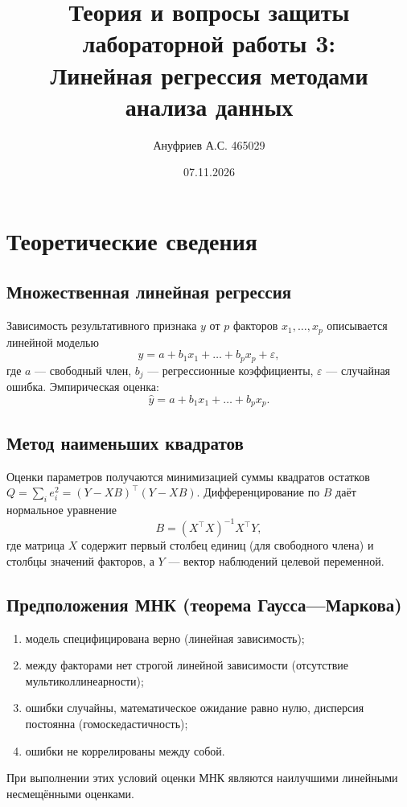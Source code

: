 \documentclass[12pt,a4paper]{article}
\title{Теория и вопросы защиты лабораторной работы 3:\\ Линейная регрессия методами анализа данных}
\author{Ануфриев А.С. 465029}
\date{07.11.2026}
\begin{document}
\maketitle

\section{Теоретические сведения}

\subsection{Множественная линейная регрессия}
Зависимость результативного признака $y$ от $p$ факторов $x_1,\dots,x_p$ описывается линейной моделью
\begin{equation}
y = a + b_1 x_1 + \dots + b_p x_p + \varepsilon ,
\end{equation}
где $a$ --- свободный член, $b_j$ --- регрессионные коэффициенты, $\varepsilon$ --- случайная ошибка. Эмпирическая оценка:
\begin{equation}
\hat{y} = a + b_1 x_1 + \dots + b_p x_p .
\end{equation}

\subsection{Метод наименьших квадратов}
Оценки параметров получаются минимизацией суммы квадратов остатков $Q = \sum_i e_i^2 = (Y-XB)^\top(Y-XB)$. Дифференцирование по $B$ даёт нормальное уравнение
\begin{equation}
B = (X^\top X)^{-1} X^\top Y ,
\end{equation}
где матрица $X$ содержит первый столбец единиц (для свободного члена) и столбцы значений факторов, а $Y$ --- вектор наблюдений целевой переменной.

\subsection{Предположения МНК (теорема Гаусса---Маркова)}
\begin{enumerate}
\item модель специфицирована верно (линейная зависимость);
\item между факторами нет строгой линейной зависимости (отсутствие мультиколлинеарности);
\item ошибки случайны, математическое ожидание равно нулю, дисперсия постоянна (гомоскедастичность);
\item ошибки не коррелированы между собой.
\end{enumerate}
При выполнении этих условий оценки МНК являются наилучшими линейными несмещёнными оценками.
\end{document}
